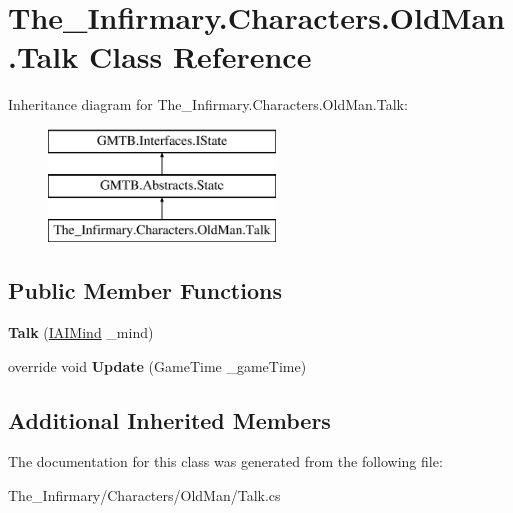 \hypertarget{class_the___infirmary_1_1_characters_1_1_old_man_1_1_talk}{}\section{The\+\_\+\+Infirmary.\+Characters.\+Old\+Man.\+Talk Class Reference}
\label{class_the___infirmary_1_1_characters_1_1_old_man_1_1_talk}
Inheritance diagram for The\+\_\+\+Infirmary.\+Characters.\+Old\+Man.\+Talk\+:\begin{figure}[H]
\begin{center}
\leavevmode
\includegraphics[height=3.000000cm]{class_the___infirmary_1_1_characters_1_1_old_man_1_1_talk}
\end{center}
\end{figure}
\subsection*{Public Member Functions}
\begin{DoxyCompactItemize}
\item 
\mbox{\label{class_the___infirmary_1_1_characters_1_1_old_man_1_1_talk_ae3f2616807bdc286bc25149c8f9e0676}} 
{\bfseries Talk} (\mbox{\hyperlink{interface_g_m_t_b_1_1_interfaces_1_1_i_a_i_mind}{I\+A\+I\+Mind}} \+\_\+mind)
\item 
\mbox{\label{class_the___infirmary_1_1_characters_1_1_old_man_1_1_talk_af2dc343d385b55d21063e7b3214db2b1}} 
override void {\bfseries Update} (Game\+Time \+\_\+game\+Time)
\end{DoxyCompactItemize}
\subsection*{Additional Inherited Members}


The documentation for this class was generated from the following file\+:\begin{DoxyCompactItemize}
\item 
The\+\_\+\+Infirmary/\+Characters/\+Old\+Man/Talk.\+cs\end{DoxyCompactItemize}
